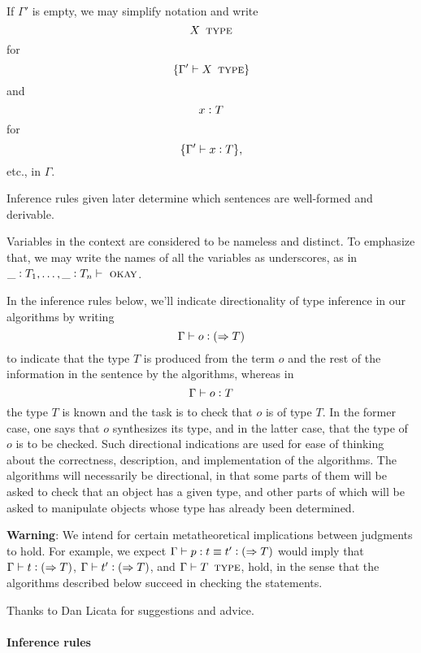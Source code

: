 \documentclass[11pt]{article}
\newcommand{\eqd}{\equiv}
\newcommand{\ccolon}[1]{\vcentcolon#1}
\newcommand{\synth}[1]{\vcentcolon(\Rightarrow#1)} %
\newcommand{\ccheck}[1]{\vcentcolon#1}  %
\newcommand{\Type}{\mathop{\text{ \sc type}}}
\newcommand{\Okay}{\mathop{\text{ \sc okay}}}
\newcommand{\var}{\char`_}
\begin{document}
If $\Gamma'$ is empty, we may simplify notation and write
$$ X \Type $$
for
$$\{ \Gamma'\vdash X \Type \}$$
and
$$x \ccolon{T}$$
for
$$\{ \Gamma'\vdash x \ccolon{T} \},$$
etc., in $\Gamma$.

Inference rules given later determine which sentences are well-formed and
derivable.

Variables in the context are considered to be nameless and distinct.  To
emphasize that, we may write the names of all the variables as underscores, as
in $\var \ccolon{T_1},\dots,\var \ccolon{T_n}\vdash \Okay$.

In the inference rules below, we'll indicate directionality of type inference
in our algorithms by writing 
$$\Gamma\vdash o \synth{T}$$ to indicate that the type $T$ is produced
from the term $o$ and the rest of the information in the sentence by the
algorithms, whereas in $$\Gamma\vdash o \ccheck{T}$$ the type $T$ is known and
the task is to check that $o$ is of type $T$.  In the former case, one says
that $o$ synthesizes its type, and in the latter case, that the type of $o$ is
to be checked.  Such directional indications are used for ease of thinking
about the correctness, description, and implementation of the algorithms.  The
algorithms will necessarily be directional, in that some parts of them will be
asked to check that an object has a given type, and other parts of which will
be asked to manipulate objects whose type has already been determined.

{\bf Warning}: We intend for certain metatheoretical implications between
judgments to hold.  For example, we expect $\Gamma \vdash p : t \eqd t'
\synth{T}$ would imply that $\Gamma \vdash t \synth{T}$, $\Gamma \vdash t'
\synth{T}$, and $\Gamma \vdash T \Type$, hold, in the sense that the algorithms
described below succeed in checking the statements.

Thanks to Dan Licata for suggestions and advice.

\paragraph{Inference rules} 
\end{document}
